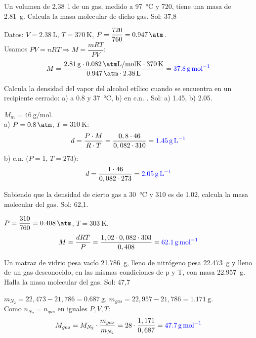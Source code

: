 \begin{exercise}
    Un volumen de \qty{2.38}{\litre} de un gas, medido a \qty{97}{\celsius} y \qty{720}{\mmhg}, tiene una masa de \qty{2.81}{\g}. Calcula la masa molecular de dicho gas.
    Sol: 37,8

    \begin{solu}
        Datos: $V = \qty{2,38}{\L}$, $T = \qty{370}{\K}$, $P = \dfrac{720}{760} = \qty{0,947}{\atm}$. \\
        Usamos $PV = nRT \Rightarrow M = \dfrac{mRT}{PV}$:
        \[ M = \dfrac{\qty{2,81}{\g} \cdot \qty{0,082}{\atm\L\per\mol\K} \cdot \qty{370}{\K}}{\qty{0,947}{\atm} \cdot \qty{2,38}{\L}} = \mathbf{\textcolor{blue}{\qty{37,8}{\g\per\mol}}} \]
    \end{solu}
\end{exercise}

\begin{exercise}
    Calcula la densidad del vapor del alcohol etílico cuando se encuentra en un recipiente cerrado: a) a \qty{0.8}{\atm} y \qty{37}{\celsius},  b) en c.n. .
    Sol: a) \qty{1.45}{\gpl},  b) \qty{2.05}{\gpl}.

    \begin{solu}
        $M_m = \qty{46}{\g\per\mol}$. \\
        a) $P = \qty{0,8}{\atm}$, $T = \qty{310}{\K}$:
        \[ d = \dfrac{P \cdot M}{R \cdot T} = \dfrac{0,8 \cdot 46}{0,082 \cdot 310} = \mathbf{\textcolor{blue}{\qty{1,45}{\g\per\L}}} \]
        b) c.n. ($P=1$, $T=273$):
        \[ d = \dfrac{1 \cdot 46}{0,082 \cdot 273} = \mathbf{\textcolor{blue}{\qty{2,05}{\g\per\L}}} \]
    \end{solu}
\end{exercise}

\begin{exercise}
    Sabiendo que la densidad de cierto gas a \qty{30}{\celsius} y \qty{310}{\mmhg} es de \qty{1.02}{\gpl}, calcula la masa molecular del gas.
    Sol: 62,1.
    \begin{solu}
        $P = \dfrac{310}{760} = \qty{0,408}{\atm}$, $T = \qty{303}{\K}$.
        \[ M = \dfrac{dRT}{P} = \dfrac{1,02 \cdot 0,082 \cdot 303}{0,408} = \mathbf{\textcolor{blue}{\qty{62,1}{\g\per\mol}}} \]
    \end{solu}
\end{exercise}

\begin{exercise}
    Un matraz de vidrio pesa vacío \qty{21.786}{\g}, lleno de nitrógeno pesa \qty{22.473}{\g} y lleno de un gas desconocido, en las mismas condiciones de p y T, con masa \qty{22.957}{\g}. Halla la masa molecular del gas. Sol: 47,7
    \begin{solu}
        $m_{N_2} = 22,473 - 21,786 = \qty{0,687}{\g}$. $m_{gas} = 22,957 - 21,786 = \qty{1,171}{\g}$. \\
        Como $n_{N_2} = n_{gas}$ en iguales $P, V, T$:
        \[ M_{gas} = M_{N_2} \cdot \dfrac{m_{gas}}{m_{N_2}} = 28 \cdot \dfrac{1,171}{0,687} = \mathbf{\textcolor{blue}{\qty{47,7}{\g\per\mol}}} \]
    \end{solu}
\end{exercise}

